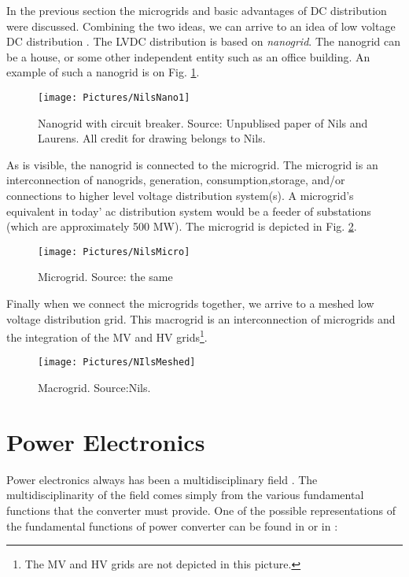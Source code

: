 \documentclass[]{scrartcl}
\begin{document}
In the previous section the microgrids and basic advantages of DC distribution were discussed. Combining the two ideas, we can arrive to an idea of low voltage DC distribution \cite{Mackay2015b}. The LVDC distribution is based on \emph{nanogrid}\cite{Mackay2015a}. The nanogrid can be a house, or some other independent entity such as an office building. An example of such a nanogrid is on Fig. \ref{fig:nilsnano1}.
\begin{figure}[h!]
\centering
\texttt{[image: Pictures/NilsNano1]}
\caption{Nanogrid with circuit breaker. Source: Unpublised paper of Nils and Laurens. All credit for drawing belongs to Nils.}
\label{fig:nilsnano1}
\end{figure}

As is visible, the nanogrid is connected to the microgrid. The microgrid is an interconnection of nanogrids, generation, consumption,storage, and/or connections to higher level voltage distribution
system(s). A microgrid’s equivalent in today' ac distribution system would be a feeder of substations (which are approximately 500 MW). The microgrid is depicted in Fig. \ref{fig:nilsmicro}.

\begin{figure}[h!]
\centering
\texttt{[image: Pictures/NilsMicro]}
\caption{Microgrid. Source: the same}
\label{fig:nilsmicro}
\end{figure}

Finally when we connect the microgrids together, we arrive to a meshed low voltage distribution grid.
This macrogrid is an interconnection of microgrids and the integration of the MV and HV grids\footnote{The MV and HV grids are not depicted in this picture.}.
\begin{figure}[h!]
\centering
\texttt{[image: Pictures/NIlsMeshed]}
\caption{Macrogrid. Source:Nils.}
\label{fig:nilsmeshed}
\end{figure}


\newpage
\newpage

\section{Power Electronics}


Power electronics always has been a multidisciplinary field \cite{Technology2015}. The multidisciplinarity of the field comes simply from the various fundamental functions that the converter must provide. One of the possible representations of the fundamental functions of power converter can be found in \cite{Wyk2012} or in \cite{VanWyk2013}: 
\end{document}
